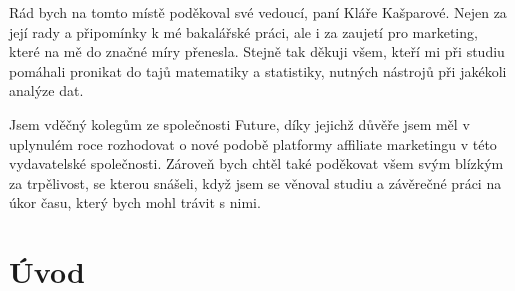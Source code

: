 \documentclass[12pt,twoside,openany]{fithesis}
\makeatletter
\def\cleardoublepage{\clearpage\if@twoside \ifodd\c@page\else
        \thispagestyle{empty}
        \hbox{}\newpage\if@twocolumn\hbox{}\newpage\fi\fi\fi}
\makeatother
\begin{document}
\SkipTocEntry\begin{ThesisThanks} %

\vspace{20mm}

Rád bych na tomto místě poděkoval své vedoucí, paní Kláře Kašparové. 
Nejen za její rady a připomínky k mé bakalářské práci, ale i za 
zaujetí pro marketing, které na mě do značné míry přenesla. Stejně tak 
děkuji všem, kteří mi při studiu pomáhali pronikat do tajů matematiky a 
statistiky, nutných nástrojů při jakékoli analýze dat. 

Jsem vděčný kolegům ze společnosti Future, díky jejichž důvěře
jsem měl v uplynulém roce rozhodovat o nové podobě platformy affiliate
marketingu v této vydavatelské společnosti. Zároveň bych 
chtěl také poděkovat všem svým blízkým za trpělivost, se kterou snášeli, 
když jsem se věnoval studiu a závěrečné práci na úkor času, který 
bych mohl trávit s nimi.

\end{ThesisThanks}
\normalsize







\tableofcontents %

\MainMatter


\cleardoublepage
\chapter*{Úvod}
{}
\end{document}

